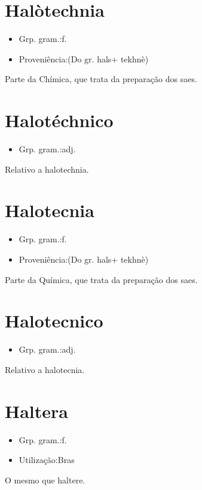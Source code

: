 \documentclass{article}
\begin{document}
\section{Halòtechnia}
\begin{itemize}
\item {Grp. gram.:f.}
\end{itemize}
\begin{itemize}
\item {Proveniência:(Do gr. \textunderscore hals\textunderscore  + \textunderscore tekhnè\textunderscore )}
\end{itemize}
Parte da Chímica, que trata da preparação dos saes.
\section{Halotéchnico}
\begin{itemize}
\item {Grp. gram.:adj.}
\end{itemize}
Relativo a halotechnia.
\section{Halotecnia}
\begin{itemize}
\item {Grp. gram.:f.}
\end{itemize}
\begin{itemize}
\item {Proveniência:(Do gr. \textunderscore hals\textunderscore  + \textunderscore tekhnè\textunderscore )}
\end{itemize}
Parte da Química, que trata da preparação dos saes.
\section{Halotecnico}
\begin{itemize}
\item {Grp. gram.:adj.}
\end{itemize}
Relativo a halotecnia.
\section{Haltera}
\begin{itemize}
\item {Grp. gram.:f.}
\end{itemize}
\begin{itemize}
\item {Utilização:Bras}
\end{itemize}
O mesmo que \textunderscore haltere\textunderscore .
\end{document}
